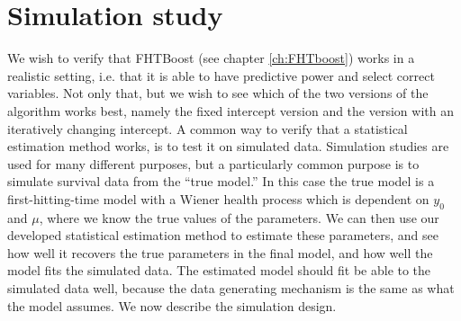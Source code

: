 \chapter{Simulation study}
We wish to verify that FHTBoost (see chapter \ref{ch:FHTboost}) works in a realistic setting, i.e. that it is able to have predictive power and select correct variables.
Not only that, but we wish to see which of the two versions of the algorithm works best, namely the fixed intercept version and the version with an iteratively changing intercept.
A common way to verify that a statistical estimation method works, is to test it on simulated data.
Simulation studies are used for many different purposes, but a particularly common purpose is to simulate survival data from the ``true model.''
In this case the true model is a first-hitting-time model with a Wiener health process which is dependent on $y_0$ and $\mu$, where we know the true values of the parameters.
We can then use our developed statistical estimation method to estimate these parameters, and see how well it recovers the true parameters in the final model, and how well the model fits the simulated data.
The estimated model should fit be able to the simulated data well, because the data generating mechanism is the same as what the model assumes.
We now describe the simulation design.

